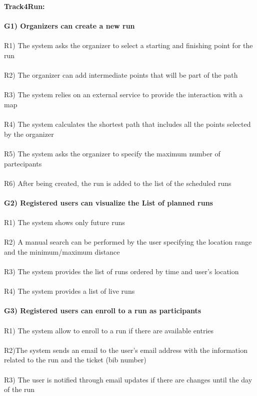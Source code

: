 \textbf{Track4Run:}\\ \\
\textbf{G1) Organizers can create a new run} \\ \\
R1) The system asks the organizer to select a starting and finishing point for the run \\ \\
R2) The organizer can add intermediate points that will be part of the path \\ \\
R3) The system relies on an external service to provide the interaction with a map \\ \\
R4) The system calculates the shortest path that includes all the points selected by the organizer \\ \\   
R5) The system asks the organizer to specify the maximum number of partecipants \\ \\
R6) After being created, the run is added to the list of the scheduled runs \\ \\
\textbf{G2) Registered users can visualize the List of planned runs} \\ \\
R1) The system shows only future runs \\ \\ 
R2) A manual search can be performed by the user specifying the location range and the minimum/maximum distance \\ \\ 
R3) The system provides the list of runs ordered by time and user’s location \\ \\
R4) The system provides a list of live runs \\ \\
\textbf{G3) Registered users can enroll to a run as participants} \\ \\
R1) The system allow to enroll to a run if there are available entries \\ \\
R2)The system sends an email to the user’s email address with the information related to the run and the ticket (bib number) \\ \\
R3) The user is notified through email updates if there are changes until the day of the run \\ \\
